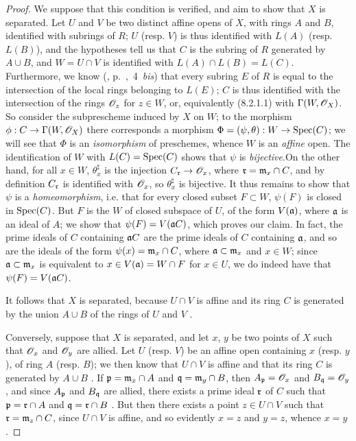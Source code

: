 \begin{proof}
\label{proof-1.8.2.2}
We suppose that this condition is verified, and aim to show that $X$ is separated.
Let $U$ and $V$ be two distinct affine opens of $X$, with rings $A$ and $B$,
identified with subrings of $R$; $U$ (resp. $V$) is thus identified 
with $L(A)$ (resp. $L(B)$), and the hypotheses tell us  that $C$ is
the subring of $R$ generated by $A\cup B$, and $W=U\cap V$ is identified with
$L(A)\cap L(B)=L(C)$. Furthermore, we know
(\cite{I-1}, p.~,~4~{\em bis}) that every subring $E$ of $R$ is
equal to the intersection of the local rings belonging to $L(E)$; $C$ is thus
identified with the intersection of the rings $\mathscr{O}_z$ for $z\in W$, or,
equivalently (8.2.1.1) with $\Gamma(W,\mathscr{O}_X)$. So consider the subprescheme
induced by $X$ on $W$; to the  morphism $\phi:
C\to\Gamma(W,\mathscr{O}_X)$ there corresponds  a morphism
$\Phi=(\psi,\theta):W\to{\mathop{\mathrm{Spec}}\nolimits}(C)$; we will see that $\Phi$ is an
{\em isomorphism} of preschemes, whence $W$ is an {\em affine} open. The
identification of $W$ with $L(C)={\mathop{\mathrm{Spec}}\nolimits}(C)$ shows that $\psi$ is
{\em bijective}.On the other hand, for all $x\in W$, $\theta_x^\sharp$ is the
injection $C_\mathfrak{r}\to\mathscr{O}_x$, where $\mathfrak{r}=\mathfrak{m}_x\cap C$,
and by definition $C_\mathfrak{r}$ is identified with $\mathscr{O}_x$, so $\theta_x^\sharp$
is bijective. It thus remains to show that $\psi$ is a {\em homeomorphism},
i.e. that for every closed subset $F\subset W$, $\psi(F)$ is closed in
${\mathop{\mathrm{Spec}}\nolimits}(C)$. But $F$ is the  $W$ of closed subspace of $U$,
of the form $V(\mathfrak{a})$, where $\mathfrak{a}$ is an ideal of $A$; we show
that $\psi(F)=V(\mathfrak{a}C)$, which proves our claim. In fact, the prime
ideals of $C$ containing $\mathfrak{a}C$ are the prime ideals of $C$ containing
$\mathfrak{a}$, and so are the ideals of the form $\psi(x)=\mathfrak{m}_x\cap
C$, where $\mathfrak{a}\subset\mathfrak{m}_x$ and $x\in W$; since
$\mathfrak{a}\subset\mathfrak{m}_x$ is equivalent to $x\in V(\mathfrak{a})=W\cap
F$ for $x\in U$, we do indeed have that $\psi(F)=V(\mathfrak{a}C)$.

It follows that $X$ is separated, because $U\cap V$ is affine and its ring $C$
is generated by the union $A\cup B$ of the rings of $U$ and $V$ .

Conversely, suppose that $X$ is separated, and let $x$, $y$ be two points of $X$
such that $\mathscr{O}_x$ and $\mathscr{O}_y$ are allied. Let $U$ (resp. $V$) be an affine open
containing $x$ (resp. $y$), of ring $A$ (resp. $B$); we then know that $U\cap V$
is affine and that its ring $C$ is generated by $A\cup B$ . If
$\mathfrak{p}=\mathfrak{m}_x\cap A$ and $\mathfrak{q}=\mathfrak{m}_y\cap B$,
then $A_\mathfrak{p}=\mathscr{O}_x$ and $B_\mathfrak{q}=\mathscr{O}_y$, and since $A_\mathfrak{p}$
and $B_\mathfrak{q}$ are allied, there exists a prime ideal $\mathfrak{r}$ of
$C$ such that $\mathfrak{p}=\mathfrak{r}\cap A$ and
$\mathfrak{q}=\mathfrak{r}\cap B$ . But then there exists a point
$z\in U\cap V$ such that $\mathfrak{r}=\mathfrak{m}_z\cap C$, since $U\cap V$ is
affine, and so evidently $x=z$ and $y=z$, whence $x=y$.
\end{proof}

